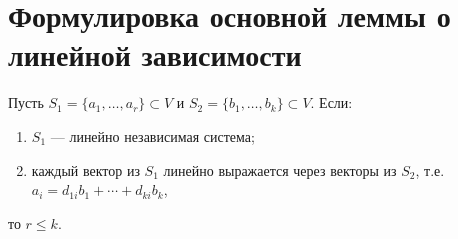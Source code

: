 \section{Формулировка основной леммы о линейной зависимости}

\begin{lemma}
Пусть $S_1 = \{a_1, \ldots, a_r\} \subset V$ и $S_2 = \{b_1, \ldots, b_k\} \subset V$. Если:
\begin{enumerate}
    \item $S_1$ --- линейно независимая система;
    \item каждый вектор из $S_1$ линейно выражается через векторы из $S_2$, т.е. $a_i = d_{1i} b_1 + \cdots + d_{ki} b_k$,
\end{enumerate}
то $r \leq k$.
\end{lemma}
